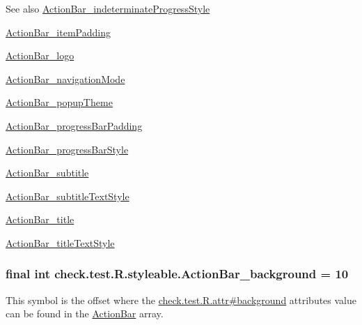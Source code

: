 \begin{DoxySeeAlso}{See also}
\hyperlink{classcheck_1_1test_1_1_r_1_1styleable_aa15c171a89aa6949c69bf05ac296389c}{Action\+Bar\+\_\+indeterminate\+Progress\+Style} 

\hyperlink{classcheck_1_1test_1_1_r_1_1styleable_a1e919ff125d9a130e6515a258bc0ebbd}{Action\+Bar\+\_\+item\+Padding} 

\hyperlink{classcheck_1_1test_1_1_r_1_1styleable_ac94a2b6df672cef0c246aff7b6bfaa23}{Action\+Bar\+\_\+logo} 

\hyperlink{classcheck_1_1test_1_1_r_1_1styleable_a52cd104b62a9b6372ea39bd7da78cb1b}{Action\+Bar\+\_\+navigation\+Mode} 

\hyperlink{classcheck_1_1test_1_1_r_1_1styleable_a50824fb411f147909363103d29b2ac25}{Action\+Bar\+\_\+popup\+Theme} 

\hyperlink{classcheck_1_1test_1_1_r_1_1styleable_a535160a98b5036d981b4bc255935336a}{Action\+Bar\+\_\+progress\+Bar\+Padding} 

\hyperlink{classcheck_1_1test_1_1_r_1_1styleable_a3789f8c4018be856bcd214951aadcb71}{Action\+Bar\+\_\+progress\+Bar\+Style} 

\hyperlink{classcheck_1_1test_1_1_r_1_1styleable_a84729c20d79b553693df4d068f7a3ceb}{Action\+Bar\+\_\+subtitle} 

\hyperlink{classcheck_1_1test_1_1_r_1_1styleable_ad8f744ed2471b251e30b55ec1193a048}{Action\+Bar\+\_\+subtitle\+Text\+Style} 

\hyperlink{classcheck_1_1test_1_1_r_1_1styleable_a9f68b2ef978d31096a2c231b92d807bc}{Action\+Bar\+\_\+title} 

\hyperlink{classcheck_1_1test_1_1_r_1_1styleable_a35a91b9015c202578382afcbaba1eab6}{Action\+Bar\+\_\+title\+Text\+Style} 
\end{DoxySeeAlso}
\hypertarget{classcheck_1_1test_1_1_r_1_1styleable_a44f8d30ccaef9f5d0d40a81733978053}{}
\subsubsection[{Action\+Bar\+\_\+background}]{\setlength{\rightskip}{0pt plus 5cm}final int check.\+test.\+R.\+styleable.\+Action\+Bar\+\_\+background = 10\hspace{0.3cm}{\ttfamily [static]}}\label{classcheck_1_1test_1_1_r_1_1styleable_a44f8d30ccaef9f5d0d40a81733978053}
This symbol is the offset where the \hyperlink{classcheck_1_1test_1_1_r_1_1attr_a5de53cfcc8516df6498e3a9365fccecb}{check.\+test.\+R.\+attr\#background} attribute\textquotesingle{}s value can be found in the \hyperlink{classcheck_1_1test_1_1_r_1_1styleable_ad0a4d403cb244ea4d22c6f6ebf2c2cdf}{Action\+Bar} array.

